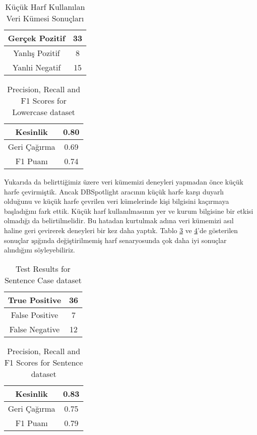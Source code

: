 \documentclass[conference]{IEEEtran}
\begin{document}
\begin{table}[!t]
	\caption{Küçük Harf Kullanılan Veri Kümesi Sonuçları}
	\label{test_result_lc}
	\centering
	\begin{tabular}{|c|c|}
		\hline
		Gerçek Pozitif & 33 \\
		\hline
		Yanlış Pozitif & 8 \\
		\hline
		Yanlıi Negatif & 15 \\
		\hline
	\end{tabular}
\end{table}
\begin{table}[!t]
	\caption{Precision, Recall and F1 Scores for Lowercase dataset}
	\label{prf1_lc}
	\centering
	\begin{tabular}{|c|c|}
		\hline
		Kesinlik & 0.80 \\
		\hline
		Geri Çağırma & 0.69 \\
		\hline
		F1 Puanı & 0.74 \\
		\hline
	\end{tabular}
\end{table}


Yukarıda da belirttiğimiz üzere veri kümemizi deneyleri yapmadan önce küçük harfe çevirmiştik.
Ancak DBSpotlight aracının küçük harfe karşı duyarlı olduğunu ve küçük harfe çevrilen veri kümelerinde kişi bilgisini kaçırmaya başladığını fark ettik. Küçük harf kullanılmasının yer ve kurum bilgisine bir etkisi olmadığı da belirtilmelidir. Bu hatadan kurtulmak adına veri kümemizi asıl haline geri çevirerek deneyleri bir kez daha yaptık. Tablo \ref{test_result_sc} ve \ref{prf1_sc}'de gösterilen sonuçlar ışığında değiştirilmemiş harf senaryosunda çok daha iyi sonuçlar alındığını söyleyebiliriz.
\begin{table}[!t]
	\caption{Test Results for Sentence Case dataset}
	\label{test_result_sc}
	\centering
	\begin{tabular}{|c|c|}
		\hline
		True Positive & 36 \\
		\hline
		False Positive & 7 \\
		\hline
		False Negative & 12 \\
		\hline
	\end{tabular}
\end{table}
\begin{table}[!t]
	\caption{Precision, Recall and F1 Scores for Sentence dataset}
	\label{prf1_sc}
	\centering
	\begin{tabular}{|c|c|}
		\hline
		Kesinlik & 0.83 \\
		\hline
		Geri Çağırma & 0.75 \\
		\hline
		F1 Puanı & 0.79 \\
		\hline
	\end{tabular}
\end{table}
\end{document}
